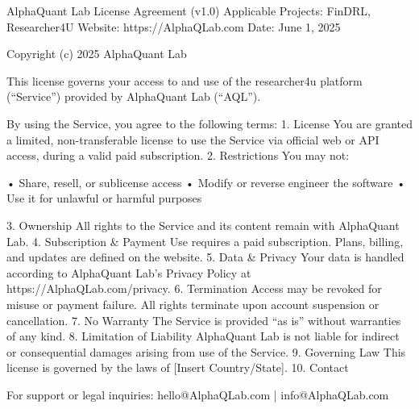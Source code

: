 AlphaQuant Lab License Agreement (v1.0)
Applicable Projects: FinDRL, Researcher4U
Website: https://AlphaQLab.com
Date: June 1, 2025

Copyright (c) 2025 AlphaQuant Lab

This license governs your access to and use of the researcher4u platform (“Service”) provided by AlphaQuant Lab (“AQL”).

By using the Service, you agree to the following terms:
	1.	License
You are granted a limited, non-transferable license to use the Service via official web or API access, during a valid paid subscription.
	2.	Restrictions
You may not:

	•	Share, resell, or sublicense access
	•	Modify or reverse engineer the software
	•	Use it for unlawful or harmful purposes

	3.	Ownership
All rights to the Service and its content remain with AlphaQuant Lab.
	4.	Subscription & Payment
Use requires a paid subscription. Plans, billing, and updates are defined on the website.
	5.	Data & Privacy
Your data is handled according to AlphaQuant Lab’s Privacy Policy at https://AlphaQLab.com/privacy.
	6.	Termination
Access may be revoked for misuse or payment failure. All rights terminate upon account suspension or cancellation.
	7.	No Warranty
The Service is provided “as is” without warranties of any kind.
	8.	Limitation of Liability
AlphaQuant Lab is not liable for indirect or consequential damages arising from use of the Service.
	9.	Governing Law
This license is governed by the laws of [Insert Country/State].
	10.	Contact

For support or legal inquiries:
hello@AlphaQLab.com | info@AlphaQLab.com
